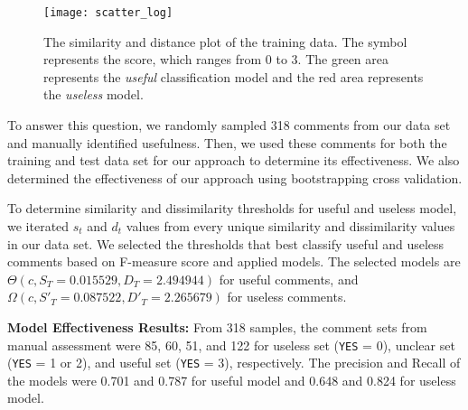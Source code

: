\begin{figure}[!t]
\centering
\texttt{[image: scatter\_log]}
\caption{The similarity and distance plot of the training data.
The symbol represents the score, which ranges from 0 to 3.
The green area represents the \emph{useful} classification model and the red area represents the \emph{useless} model.}
\label{fig:scatter}
\end{figure}

To answer this question, we randomly sampled 318 comments from our data set and manually identified usefulness.
Then, we used these comments for both the training and test data set for our approach to determine its effectiveness.
We also determined the effectiveness of our approach using bootstrapping cross validation.


%

To determine similarity and dissimilarity thresholds for useful and useless model, we iterated $s_t$ and $d_t$ values from every unique similarity and dissimilarity values in our data set.
We selected the thresholds that best classify useful and useless comments based on F-measure score and applied models.
The selected models are $\Theta(c,S_T=0.015529,D_T=2.494944)$ for useful comments, and $\Omega(c,S'_T=0.087522,D'_T=2.265679)$ for useless comments.




\textbf{Model Effectiveness Results:} From 318 samples, the comment sets from manual assessment were 85, 60, 51, and 122 for useless set (\texttt{YES} = 0), unclear set (\texttt{YES} = 1 or 2), and useful set (\texttt{YES} = 3), respectively. The precision and Recall of the models were 0.701 and 0.787 for useful model and 0.648 and 0.824 for useless model. 

